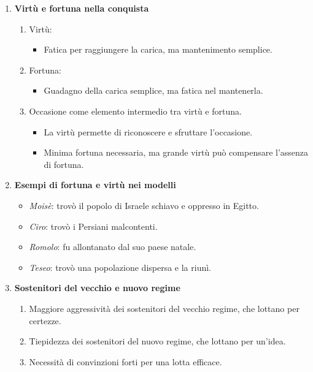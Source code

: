 \documentclass{article}
\begin{document}
\begin{enumerate}
    \item \textbf{Virtù e fortuna nella conquista}
    \begin{enumerate}
        \item Virtù:
        \begin{itemize}
            \item Fatica per raggiungere la carica, ma mantenimento semplice.
        \end{itemize}
        \item Fortuna:
        \begin{itemize}
            \item Guadagno della carica semplice, ma fatica nel mantenerla.
        \end{itemize}
        \item Occasione come elemento intermedio tra virtù e fortuna.
        \begin{itemize}
            \item La virtù permette di riconoscere e sfruttare l'occasione.
            \item Minima fortuna necessaria, ma grande virtù può compensare l'assenza di fortuna.
        \end{itemize}
    \end{enumerate}

    \item \textbf{Esempi di fortuna e virtù nei modelli}
    \begin{itemize}
        \item \textit{Moisè}: trovò il popolo di Israele schiavo e oppresso in Egitto.
        \item \textit{Ciro}: trovò i Persiani malcontenti.
        \item \textit{Romolo}: fu allontanato dal suo paese natale.
        \item \textit{Teseo}: trovò una popolazione dispersa e la riunì.
    \end{itemize}

    \item \textbf{Sostenitori del vecchio e nuovo regime}
    \begin{enumerate}[label*=\arabic*.]
        \item Maggiore aggressività dei sostenitori del vecchio regime, che lottano per certezze.
        \item Tiepidezza dei sostenitori del nuovo regime, che lottano per un'idea.
        \item Necessità di convinzioni forti per una lotta efficace.
    \end{enumerate}


\end{enumerate}
\end{document}
